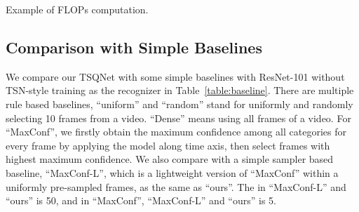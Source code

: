 \documentclass[runningheads]{llncs}
\newcommand{\tabref}[1]{Table~\ref{#1}}
\begin{document}
\begin{table*}[t]
\centering
\begin{minipage}[t]{0.45\linewidth}
\caption{Example of FLOPs computation.}
\label{tab:flops}
\centering
{}
\end{minipage}
\hfill
\begin{minipage}[t]{0.45\linewidth}
\caption{Comparisons with simple baselines.}
\label{table:baseline}
\centering
\setlength{\tabcolsep}{4pt}
\end{minipage}
\end{table*} \subsection{Comparison with Simple Baselines}\label{exp:baseline}
We compare our TSQNet with some simple baselines with ResNet-101 without TSN-style training as the recognizer in \tabref{table:baseline}. There are multiple rule based baselines, ``uniform'' and ``random'' stand for uniformly and randomly selecting 10 frames from a video. ``Dense'' means using all frames of a video. For ``MaxConf'', we firstly obtain the maximum confidence among all categories for every frame by applying the model along time axis, then select  frames with highest maximum confidence. We also compare with a simple sampler based baseline, ``MaxConf-L'', which is a lightweight version of ``MaxConf'' within a uniformly pre-sampled  frames, as the same as ``ours''. The  in ``MaxConf-L'' and ``ours'' is 50, and  in ``MaxConf'', ``MaxConf-L'' and ``ours'' is 5.
\end{document}
